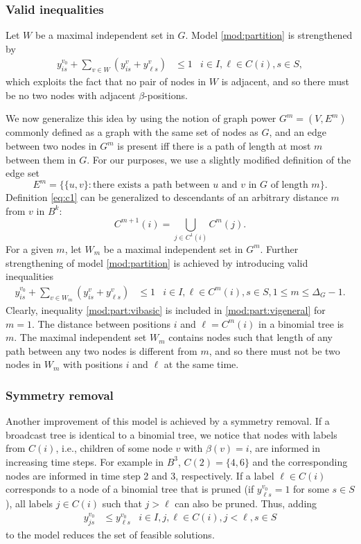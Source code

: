 \subsubsection{Valid inequalities}
Let $W$ be a maximal independent set in $G$.
Model \eqref{mod:partition} is strengthened by
\begin{align}
\label{mod:part:vibasic}
y^{v_0}_{is}+ \sum\limits_{v\in W}(y^v_{is}+y^v_{\ell s})&\leq 1 & i\in I,\ell\in C(i), s\in S,
\end{align}
which exploits the fact that no pair of nodes in $W$ is adjacent, and so there must be no two nodes with adjacent $\beta$-positions.

We now generalize this idea by using the notion of graph power $G^m=(V,E^m)$ commonly defined as a graph with the same set of nodes as $G$,
and an edge between two nodes in $G^m$ is present iff there is a path of length at most $m$ between them in $G$.
For our purposes, we use a slightly modified definition of the edge set
$$E^m=\{\{u,v\}:\text{there exists a path between $u$ and $v$ in $G$ of length $m$}\}.$$
Definition \eqref{eq:c1} can be generalized to descendants of an arbitrary distance $m$ from $v$ in $B^k$:
\begin{equation}
C^{m+1}(i)=\bigcup_{j\in C^1(i)}C^m(j).
\end{equation}
For a given $m$, let $W_m$ be a maximal independent set in $G^m$.
Further strengthening of model \eqref{mod:partition} is achieved by introducing valid inequalities
\begin{align}
\label{mod:part:vigeneral}
y^{v_0}_{is}+ \sum\limits_{v\in W_m}(y^v_{is}+y^v_{\ell s})&\leq 1 & i\in I,\ell\in C^m(i), s\in S,1\leq m\leq \Delta_G-1.
\end{align}
Clearly, inequality \eqref{mod:part:vibasic} is included in \eqref{mod:part:vigeneral} for $m=1$.
The distance between positions $i$ and $\ell=C^m(i)$ in a binomial tree is $m$.
The maximal independent set $W_m$ contains nodes such that length of any path between any two nodes is different from $m$,
and so there must not be two nodes in $W_m$ with positions $i$ and $\ell$ at the same time.

\subsubsection{Symmetry removal}
Another improvement of this model is achieved by a symmetry removal.
If a broadcast tree is identical to a binomial tree, we notice that nodes with labels from $C(i)$, i.e., children of some node $v$ with $\beta(v)=i$, are informed in increasing time steps.
For example in $B^3$, $C(2)=\{4,6\}$ and the corresponding nodes are informed in time step 2 and 3, respectively.
If a label $\ell\in C(i)$ corresponds to a node of a binomial tree that is pruned (if $y^{v_0}_{\ell s}=1$ for some $s\in S$),
all labels $j\in C(i)$ such that $j>\ell$ can also be pruned.
Thus, adding
\begin{align}
\label{mod:part:sr}
y^{v_0}_{js}&\leq y^{v_0}_{\ell s}&i\in I,j,\ell\in C(i),j<\ell, s\in S
\end{align}
to the model reduces the set of feasible solutions.

